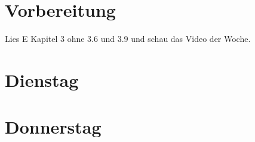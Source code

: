 \documentclass{uebung_cs}
\begin{document}
\section*{Vorbereitung}
Lies E Kapitel 3 ohne 3.6 und 3.9 und schau das Video der Woche.

\section*{Dienstag}
\begin{aufgabe}[test]
\end{aufgabe}

\section*{Donnerstag}
\begin{aufgabe}[test]
\end{aufgabe}
\end{document}
